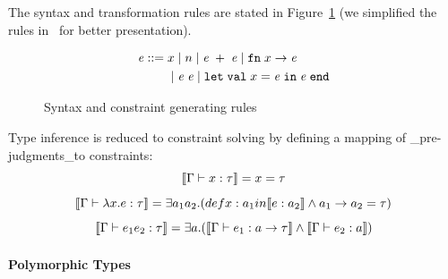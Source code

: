 The syntax and transformation rules are stated in
Figure~\ref{figure:ml-constraints} (we simplified the rules
in~\cite{haack:slicing} for better presentation).

\begin{figure}
\hfil
\begin{minipage}{2.3in}
\begin{align*}
\mathit{e} ::=\; & x \mid n \mid \mathit{e}\; + \; \mathit{e} \mid \mathtt{fn}\; x \rightarrow \mathit{e} \\
        & \mid \mathit{e}\; \mathit{e} \mid \mathtt{let}\; \mathtt{val}\; x = \mathit{e}\; \mathtt{in}\; \mathit{e}\; \mathtt{end}
\end{align*}

\end{minipage}
\hfil
\caption{Syntax and constraint generating rules}
\label{figure:ml-constraints}
\end{figure}


Type inference is reduced to constraint solving by defining a mapping
of _pre-judgments_to constraints:
\[\llbracket \Gamma \vdash x:\tau \rrbracket = x =\tau\]
\[\llbracket \Gamma \vdash \lambda x.e:\tau \rrbracket = \exists a_1 a_2.
(def x: a_1 in \llbracket e:a_2 \rrbracket \land a_1 \rightarrow a_2 =\tau)\]
\[\llbracket \Gamma\vdash e_1 e_2 : \tau \rrbracket = \exists a.(\llbracket \Gamma \vdash
e_1:a\rightarrow \tau \rrbracket\land \llbracket \Gamma\vdash e_2:a \rrbracket)\]


\paragraph{Polymorphic Types}


